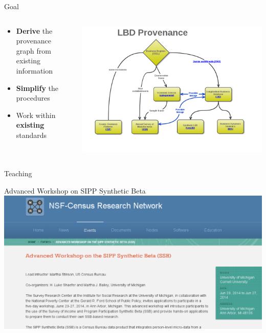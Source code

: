 \begin{frame}{Goal}
\begin{columns}[T]
\begin{column}{0.45\textwidth}
\begin{itemize}[<+->]
\item {\bf Derive} the provenance graph from existing information
\item {\bf Simplify} the procedures
\item Work within {\bf existing} standards
\end{itemize}
\end{column}
\begin{column}{0.55\textwidth}
\includegraphics[width=\textwidth]{LBD_Provenance.png}

\end{column}

\end{columns}
\end{frame}



\begin{frame}
\end{frame}

\begin{frame}{Teaching}
\begin{block}{Advanced Workshop on SIPP Synthetic Beta}
\href{http://www.ncrn.info/event/advanced-workshop-sipp-synthetic-beta-ssb}{\includegraphics[height=0.6\textheight]{Selection_083.png}}
\end{block}
\end{frame}

